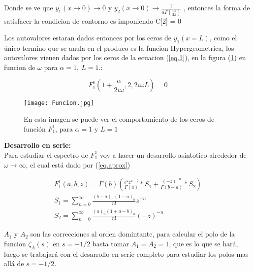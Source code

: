 Donde se ve que $y _1 (x \rightarrow 0 ) \rightarrow 0$ y $y _2 (x \rightarrow 0)  \rightarrow
\frac{1}{  \alpha   \Gamma ( \frac{i \alpha}{2 \lambda}  )   } $ , entonces la forma de satisfacer la condicion de contorno es imponiendo C[2] = 0

Los autovalores estaran dados entonces por los ceros de $y_1 (x= L)$, como el único termino que se anula en el produco es la funcion Hypergeometrica, los autovalores vienen dados por los ceros de la ecuacion (\ref{eq.1}), en la figura (\ref{fig:funcion}) en funcion de $\omega$ para  $\alpha=1, \ L=1$.:


\begin{equation}
F _1 ^1 (1+\frac{ \alpha}{2 i \omega},2,2 i \omega L)  = 0
\label{eq.1}
\end{equation}

\begin{figure}
\centering
\texttt{[image: Funcion.jpg]}
\caption{En esta imagen se puede ver el comportamiento de los ceros de función $F _1 ^1$, para $\alpha=1$ y $L=1$}
\label{fig:funcion}
\end{figure}

\textbf{Desarrollo en serie:} \\

Para estudiar el espectro de $F _1 ^1$ voy a hacer un desarrollo asintotico alrededor de $\omega \rightarrow \infty$, el cual está dado por (\ref{eq.aprox})


\begin{equation}
\begin{array}{c}
    F _1 ^1 (a,b,z) = \Gamma (b) 
    \left(
    \frac{e^z z ^{a-b} }{\Gamma(a)} * S_1 + \frac{(-z) ^{ -a}}{ \Gamma(b-a)} 
    * S_2
    \right) \\ 
    S _1 = \sum _{n=0} ^{\infty} \frac{(b-a) _n (1-a) _n}{n!} z ^{-n} \\ 
    S _2 = \sum _{n=0} ^{\infty} \frac{(a) _n (1+a-b) _n}{n!} (-z) ^{-n}
    
\end{array}
\label{eq.aprox}
\end{equation}

$A_1$ y $A _2$ son las correcciones al orden domintante, para calcular el polo de la funcion $\zeta _A (s)$ en $s=-1/2$ basta tomar $A _1 = A _2 = 1$, que es lo que se hará, luego se trabajará con el desarrollo en serie completo para estudiar los polos mas allá de $s=-1/2$. 



